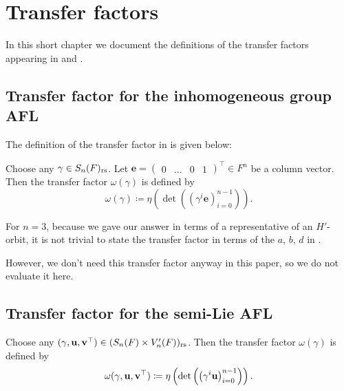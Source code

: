 \section{Transfer factors}
\label{ch:transf}

In this short chapter we document the definitions of the transfer
factors appearing in  and .

\subsection{Transfer factor for the inhomogeneous group AFL}
The definition of the transfer factor in  is given below:
\begin{definition}
  Choose any $\gamma \in S_n(F)_{\mathrm{rs}}$.
  Let $\mathbf{e} = \begin{pmatrix} 0 & \dots & 0 & 1 \end{pmatrix}^\top \in F^n$
  be a column vector.
  Then the transfer factor $\omega(\gamma)$ is defined by
  \[ \omega(\gamma) \coloneqq
    \eta\left( \det\left( \left( \gamma^i \mathbf{e} \right)_{i=0}^{n-1} \right) \right).
  \]
\end{definition}

\ifthesis
For $n=3$, because we gave our answer in terms of a representative
of an $H'$-orbit, it is not trivial to state the transfer factor
in terms of the $a$, $b$, $d$ in .

However, we don't need this transfer factor anyway in this paper,
so we do not evaluate it here.
\fi

\subsection{Transfer factor for the semi-Lie AFL}
\begin{definition}
  Choose any ${(\gamma, \mathbf u, \mathbf v^\top)} \in (S_n(F) \times V'_n(F))_{\mathrm{rs}}$.
  Then the transfer factor $\omega(\gamma)$ is defined by
  \[ \omega{(\gamma, \mathbf u, \mathbf v^\top)} \coloneqq
    \eta\left( \det\left( \left( \gamma^i \mathbf u \right)_{i=0}^{n-1} \right) \right).
  \]
\end{definition}

